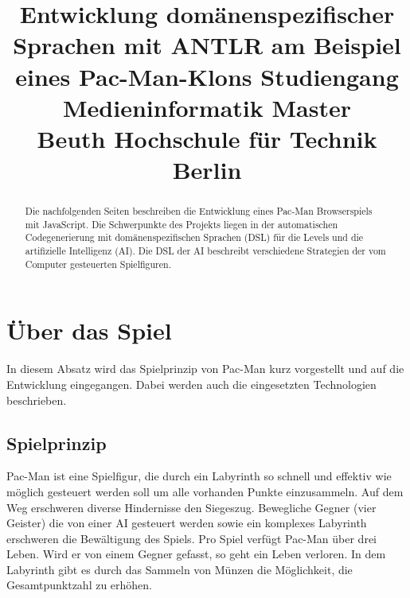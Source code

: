\documentclass[conference]{IEEEtran}
\begin{document}
\title{%
  Entwicklung domänenspezifischer Sprachen mit ANTLR am Beispiel eines Pac-Man-Klons\bigbreak
  \large Studiengang Medieninformatik Master\\Beuth Hochschule für Technik Berlin}


\author{
\and
{}
\and
{}
}

\maketitle

\lstset{%
  basicstyle=\footnotesize\ttfamily
  }
\begin{abstract}
Die nachfolgenden Seiten beschreiben die Entwicklung eines Pac-Man Browserspiels mit JavaScript. Die Schwerpunkte des Projekts liegen in der automatischen Codegenerierung mit domänenspezifischen Sprachen (DSL) für die Levels und die artifizielle Intelligenz (AI). Die DSL der AI beschreibt verschiedene Strategien der vom  Computer gesteuerten Spielfiguren.
\end{abstract}

\IEEEpeerreviewmaketitle



\section{Über das Spiel}

In diesem Absatz wird das Spielprinzip von Pac-Man kurz vorgestellt und auf die Entwicklung eingegangen. Dabei werden auch die eingesetzten Technologien beschrieben.

\subsection{Spielprinzip}
Pac-Man ist eine Spielfigur, die durch ein Labyrinth so schnell und effektiv wie möglich gesteuert werden soll um alle vorhanden Punkte einzusammeln. Auf dem Weg erschweren diverse Hindernisse den Siegeszug. Bewegliche Gegner (vier Geister) die von einer AI gesteuert werden sowie ein komplexes Labyrinth erschweren die Bewältigung des Spiels. Pro Spiel verfügt Pac-Man über drei Leben. Wird er von einem Gegner gefasst, so geht ein Leben verloren. In dem Labyrinth gibt es durch das Sammeln von Münzen die Möglichkeit, die Gesamtpunktzahl zu erhöhen.
\end{document}
